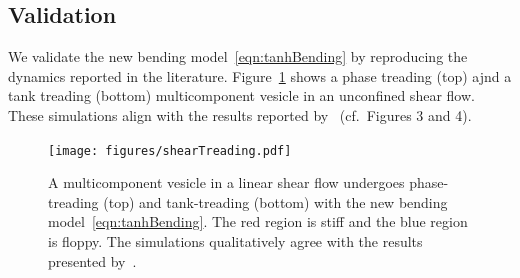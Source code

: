 \documentclass[twoside,twocolumn,9pt]{article}
\newcommand{\subfigimg}[3][,]{%
  \setbox1=\hbox{\texttt{[image: \#3]}}%
  \leavevmode\rlap{\usebox1}%
  \rlap{\hspace*{0pt}\raisebox{\dimexpr\ht1-0\baselineskip}{\bf
  \normalsize #2}}%
  \phantom{\usebox1}%
}
\begin{document}
\subsection{Validation}
\label{sec:validation}
We validate the new bending model~\eqref{eqn:tanhBending} by reproducing
the dynamics reported in the literature. Figure~\ref{fig:treading} shows
a phase treading (top) ajnd a tank treading (bottom) multicomponent
vesicle in an unconfined shear flow. These simulations align with the
results reported by~\citet{liu-mar-li-vee-low2017} (cf.~Figures 3 and
4).
\begin{figure}[H]
  \centering
  \texttt{[image: figures/shearTreading.pdf]}
  \caption{\label{fig:treading} \small A multicomponent vesicle in a
  linear shear flow undergoes phase-treading (top) and tank-treading
  (bottom) with the new bending model~\eqref{eqn:tanhBending}. The red
  region is stiff and the blue region is floppy. The simulations
  qualitatively agree with the results presented
  by~\citet{liu-mar-li-vee-low2017}.}
\end{figure}

\end{document}
